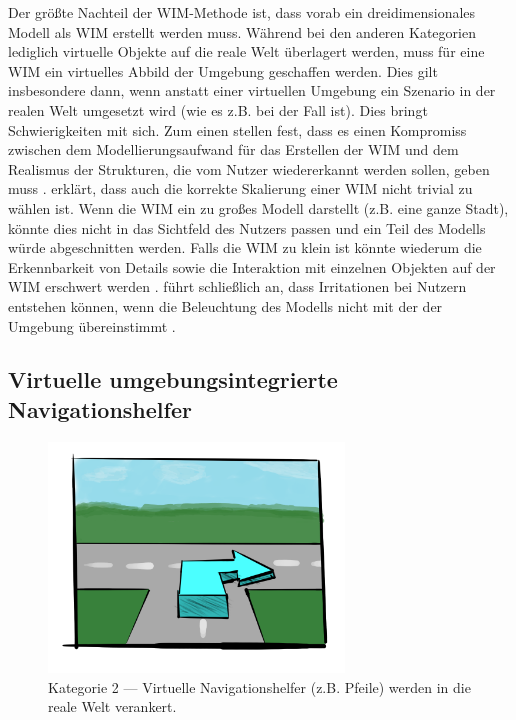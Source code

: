 Der größte Nachteil der WIM-Methode ist, dass vorab ein dreidimensionales Modell als WIM erstellt werden muss.
Während bei den anderen Kategorien lediglich virtuelle Objekte auf die reale Welt überlagert werden, muss für eine WIM ein virtuelles Abbild der Umgebung geschaffen werden.
Dies gilt insbesondere dann, wenn anstatt einer virtuellen Umgebung ein Szenario in der realen Welt umgesetzt wird (wie es z.B. bei \textcite{Mulloni2012} der Fall ist).
Dies bringt Schwierigkeiten mit sich.
Zum einen stellen \citeauthor{Mulloni2012} fest, dass es einen Kompromiss zwischen dem Modellierungsaufwand für das Erstellen der WIM und dem Realismus der Strukturen, die vom Nutzer wiedererkannt werden sollen, geben muss \parencite[215]{Mulloni2012}.
\citeauthor{Elvezio2017} erklärt, dass auch die korrekte Skalierung einer WIM nicht trivial zu wählen ist.
Wenn die WIM ein zu großes Modell darstellt (z.B. eine ganze Stadt), könnte dies nicht in das Sichtfeld des Nutzers passen und ein Teil des Modells würde abgeschnitten werden.
Falls die WIM zu klein ist könnte wiederum die Erkennbarkeit von Details sowie die Interaktion mit einzelnen Objekten auf der WIM erschwert werden \parencite[1]{Elvezio2017}.
\citeauthor{Stoakley1995} führt schließlich an, dass Irritationen bei Nutzern entstehen können, wenn die Beleuchtung des Modells nicht mit der der Umgebung übereinstimmt \parencite[269]{Stoakley1995}.

\subsection{Virtuelle umgebungsintegrierte Navigationshelfer}
\begin{figure}[h]
    \centering
    \includegraphics[width=0.7\textwidth]{figures/sketch_ar_arrows}
    \caption{Kategorie 2 --- Virtuelle Navigationshelfer (z.B. Pfeile) werden in die reale Welt verankert.}
    \label{fig:sketch_ar_arrows}
\end{figure}

